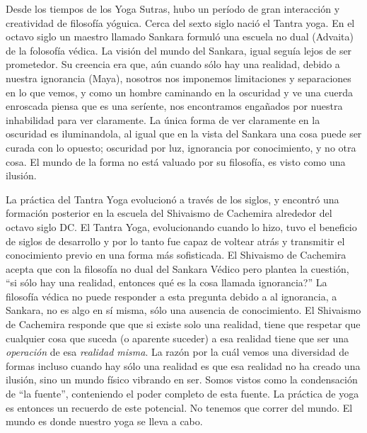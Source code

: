 Desde los tiempos de los Yoga Sutras, hubo un período de gran interacción y creatividad de filosofía yóguica. Cerca del sexto siglo nació el Tantra yoga. En el octavo siglo un maestro llamado Sankara formuló una escuela no dual (Advaita) de la folosofía v\'edica. La visión del mundo del Sankara, igual seguía lejos de ser prometedor. Su creencia era que, aún cuando sólo hay una realidad, debido a nuestra ignorancia (Maya), nosotros nos imponemos limitaciones y separaciones en lo que vemos, y como un hombre caminando en la oscuridad y ve una cuerda enroscada piensa que es una seríente, nos encontramos engañados por nuestra inhabilidad para ver claramente. La única forma de ver claramente en la oscuridad es iluminandola, al igual que en la vista del Sankara una cosa puede ser curada con lo opuesto; oscuridad por luz, ignorancia por conocimiento, y no otra cosa. El mundo de la forma no está valuado por su filosofía, es visto como una ilusión.

La práctica del Tantra Yoga evolucionó a trav\'es de los siglos, y encontró una formación posterior en la escuela del Shivaismo de Cachemira alrededor del octavo siglo DC. El Tantra Yoga, evolucionando cuando lo hizo, tuvo el beneficio de siglos de desarrollo y por lo tanto fue capaz de voltear atrás y transmitir el conocimiento previo en una forma más sofisticada. El Shivaismo de Cachemira acepta que con la filosofía no dual del Sankara V\'edico pero plantea la cuestión, ``si sólo hay una realidad, entonces qu\'e es la cosa llamada ignorancia?'' La filosofía v\'edica no puede responder a esta pregunta debido a al ignorancia, a Sankara, no es algo en sí misma, sólo una ausencia de conocimiento. El Shivaismo de Cachemira responde que que si existe solo una realidad, tiene que respetar que cualquier cosa que suceda (o aparente suceder) a esa realidad tiene que ser una \textit{operación} de esa \textit{realidad misma}. La razón por la cuál vemos una diversidad de formas incluso cuando hay sólo una realidad es que esa realidad no ha creado una ilusión, sino un mundo físico vibrando en ser. Somos vistos como la condensación de ``la fuente'', conteniendo el poder completo de esta fuente. La práctica de yoga es entonces un recuerdo de este potencial. No tenemos que correr del mundo. El mundo es donde nuestro yoga se lleva a cabo.

